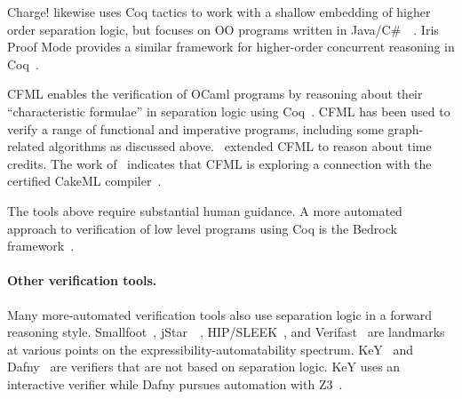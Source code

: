 Charge! likewise uses Coq tactics to work with a shallow embedding of higher 
order separation logic, but focuses on OO programs written in 
Java/C\#~~\cite{bengtson:charge}. Iris Proof Mode provides a similar framework 
for higher-order concurrent reasoning in Coq~\cite{krebbers:iris}.

CFML enables the verification of OCaml programs by reasoning about their
``characteristic formulae'' in separation logic using Coq~\cite{char10, char11}. 
CFML has been used to verify a range of functional and imperative programs,
including some graph-related algorithms as discussed 
above. \citet{charpott15, charpott19}~extended CFML to reason about time 
credits. The work of \citet{gueneau17}~indicates that CFML is exploring a connection 
with the certified CakeML compiler~\cite{cakeml}.

The tools above require substantial human guidance. A more automated approach to verification of low level programs using Coq is the Bedrock framework~\cite{chlipala:bedrock}.


\paragraph{Other verification tools.} 

Many more-automated verification tools also use separation logic in a forward
reasoning style. Smallfoot~\cite{berdine:smallfoot}, jStar~~\cite{distefanop08}, 
HIP/SLEEK~\cite{chin:hipsleek}, and Verifast~\cite{jacobs:verifast} are landmarks
at various points on the expressibility-automatability spectrum. 
KeY~\cite{beckert:2007} and Dafny~\cite{leino10} are verifiers that are not 
based on separation logic. KeY uses an interactive verifier while Dafny pursues
 automation with Z3~\cite{moura2008}.


